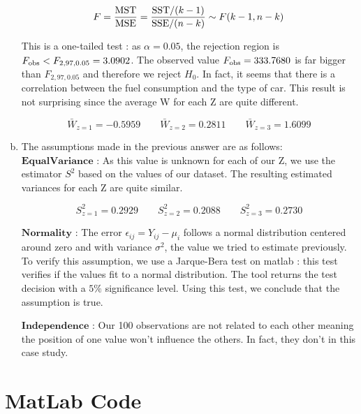 \documentclass[a4paper]{article}
\begin{document}
\begin{enumerate}[(a)]
$$F = \frac{\textup{MST}}{\textup{MSE}} = \frac{\textup{SST}/(k-1)}{\textup{SSE}/(n-k)} \sim F(k-1,n-k)$$

This is a one-tailed test : as $\alpha  = 0.05$, the rejection region is $F_{\textup{obs}} < F_{2,97,0.05} = 3.0902$. The observed value $F_{\textup{obs}}=333.7680$  is far bigger than $F_{2,97,0.05}$ and therefore we reject $H_0$. In fact, it seems that there is a correlation between the fuel consumption and the type of car. This result is not surprising since the average W for each Z are quite different.

$$\bar{W}_{z=1} = -0.5959 \qquad \bar{W}_{z=2} = 0.2811 \qquad \bar{W}_{z=3} = 1.6099$$


\item The assumptions made in the previous answer are as follows:
\\
$\mathbf{Equal} \mathbf{Variance}$ : As this value is unknown for each of our Z, we use the estimator $S^2$ based on the values of our dataset. The resulting estimated variances for each Z are quite similar.

$$S^2_{z=1} = 0.2929 \qquad S^2_{z=2} = 0.2088 \qquad S^2_{z=3}  = 0.2730$$

$\mathbf{Normality}$ : The error $\epsilon_{ij} = Y_{ij} - \mu_i$ follows a normal distribution centered around zero and with variance $\sigma^2$, the value we tried to estimate previously. To verify this assumption, we use a Jarque-Bera test on matlab : this test verifies if the values fit to a normal distribution. The tool returns the test decision with a $5\%$ significance level. Using this test, we conclude that the assumption is true.

$\mathbf{Independence}$ : Our 100 observations are not related to each other meaning the position of one value won't influence the others. In fact, they don't in this case study.

\end{enumerate}


\newpage

\appendix

\section{MatLab Code}
\end{document}
